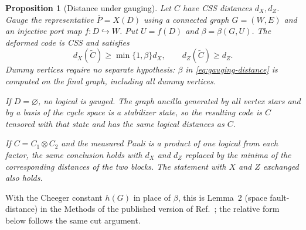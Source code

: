 \documentclass[aps,prx,reprint,superscriptaddress,nofootinbib,floatfix,longbibliography]{revtex4-2}
\newtheorem{proposition}[theorem]{Proposition}
\theoremstyle{definition}
\begin{document}
\begin{proposition}[Distance under gauging]
\label{prop:gauging-distance}
Let $C$ have CSS distances $d_X,d_Z$.  Gauge the representative
$\overline P=X(D)$ using a connected graph $G=(W,E)$ and an injective port
map $f:D\hookrightarrow W$.  Put $U=f(D)$ and
$\beta=\beta(G,U)$.  The deformed code is CSS and satisfies
\begin{equation}
 d_X(\widetilde C)\geq \min\{1,\beta\}d_X,
 \qquad
 d_Z(\widetilde C)\geq d_Z.
 \label{eq:gauging-distance}
\end{equation}
Dummy vertices require no separate hypothesis: $\beta$ in
\eqref{eq:gauging-distance} is computed on the final graph,
including all dummy vertices.

If $D=\varnothing$, no logical is gauged.  The graph ancilla generated by
all vertex stars and by a basis of the cycle space is a stabilizer state, so
the resulting code is $C$ tensored with that state and has the same logical
distances as $C$.

If $C=C_1\otimes C_2$ and the measured Pauli is a product of one logical
from each factor, the same conclusion holds with $d_X$ and $d_Z$ replaced
by the minima of the corresponding distances of the two blocks.
The statement with $X$ and $Z$ exchanged also holds.
\end{proposition}

With the Cheeger constant $h(G)$ in place of $\beta$, this is Lemma~2 (space
fault-distance) in the Methods of the published version of
Ref.~\cite{WilliamsonYoderGauging}; the relative form below follows the same
cut argument.
\end{document}
